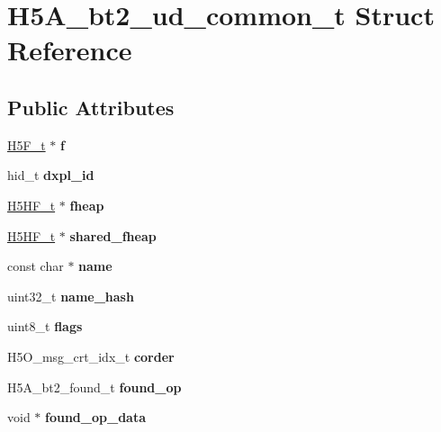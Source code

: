 \hypertarget{struct_h5_a__bt2__ud__common__t}{}\section{H5\+A\+\_\+bt2\+\_\+ud\+\_\+common\+\_\+t Struct Reference}
\label{struct_h5_a__bt2__ud__common__t}
\subsection*{Public Attributes}
\begin{DoxyCompactItemize}
\item 
\mbox{\label{struct_h5_a__bt2__ud__common__t_a7b6e58c99213dad4b744c9467bca74e9}} 
\hyperlink{struct_h5_f__t}{H5\+F\+\_\+t} $\ast$ {\bfseries f}
\item 
\mbox{\label{struct_h5_a__bt2__ud__common__t_a6366d72948da1a7e8ec3ec0e72b9ece7}} 
hid\+\_\+t {\bfseries dxpl\+\_\+id}
\item 
\mbox{\label{struct_h5_a__bt2__ud__common__t_a65cf39b2249ced40f40a561e593ae1ab}} 
\hyperlink{struct_h5_h_f__t}{H5\+H\+F\+\_\+t} $\ast$ {\bfseries fheap}
\item 
\mbox{\label{struct_h5_a__bt2__ud__common__t_aac4f7a5f8baef26d390fbed60fb7a2bd}} 
\hyperlink{struct_h5_h_f__t}{H5\+H\+F\+\_\+t} $\ast$ {\bfseries shared\+\_\+fheap}
\item 
\mbox{\label{struct_h5_a__bt2__ud__common__t_aee6dabd848c8b968dd28351dc63010f0}} 
const char $\ast$ {\bfseries name}
\item 
\mbox{\label{struct_h5_a__bt2__ud__common__t_a124ecd3387e678025e3c04c568fe5ff2}} 
uint32\+\_\+t {\bfseries name\+\_\+hash}
\item 
\mbox{\label{struct_h5_a__bt2__ud__common__t_a7fddd0f0721bfb8b30560b83726ea348}} 
uint8\+\_\+t {\bfseries flags}
\item 
\mbox{\label{struct_h5_a__bt2__ud__common__t_ae4b795ff6181b00d62cc427650c93201}} 
H5\+O\+\_\+msg\+\_\+crt\+\_\+idx\+\_\+t {\bfseries corder}
\item 
\mbox{\label{struct_h5_a__bt2__ud__common__t_a1218c6e15e8f9b326f70bbb40a5592d4}} 
H5\+A\+\_\+bt2\+\_\+found\+\_\+t {\bfseries found\+\_\+op}
\item 
\mbox{\label{struct_h5_a__bt2__ud__common__t_ac794460cdbb89e6cce585777fc08b61f}} 
void $\ast$ {\bfseries found\+\_\+op\+\_\+data}
\end{DoxyCompactItemize}


